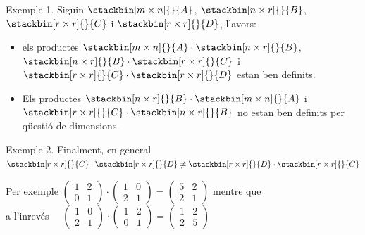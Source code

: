 \documentclass{beamer}
\begin{document}
\begin{frame}
\begin{exampleblock}{Exemple 1.}
Siguin $\stackbin[m\times n]{}{A}$, $\stackbin[n\times r]{}{B}$, $\stackbin[r\times r]{}{C}$ i $\stackbin[r\times r]{}{D}$, llavors:
 \begin{itemize}
 \item
 els productes $\stackbin[m\times n]{}{A}\cdot\stackbin[n\times r]{}{B}$, $\stackbin[n\times r]{}{B}\cdot\stackbin[r\times r]{}{C}$ i $\stackbin[r\times r]{}{C}\cdot\stackbin[r\times r]{}{D}$ estan ben definits.
\item
Els productes $\stackbin[n\times r]{}{B}\cdot\stackbin[m\times n]{}{A}$ i $\stackbin[r\times r]{}{C}\cdot\stackbin[n\times r]{}{B}$ no estan ben definits per qüestió de dimensions.
\end{itemize}
\end{exampleblock}
\begin{exampleblock}{Exemple 2.}
 Finalment, en general $\stackbin[r\times r]{}{C}\cdot\stackbin[r\times r]{}{D}\neq\stackbin[r\times r]{}{D}\cdot\stackbin[r\times r]{}{C}$

Per exemple
$\left(\begin{array}{cc}
1 & 2\\
0 & 1\end{array}\right)\cdot\left(\begin{array}{cc}
1 & 0\\
2 & 1\end{array}\right)=\left(\begin{array}{cc}
5 & 2\\
2 & 1\end{array}\right)$
\bigskip
mentre que\\
a l'inrevés $\quad\left(\begin{array}{cc}
1 & 0\\
2 & 1\end{array}\right)\cdot\left(\begin{array}{cc}
1 & 2\\
0 & 1\end{array}\right)=\left(\begin{array}{cc}
1 & 2\\
2 & 5\end{array}\right)$
\end{exampleblock}
\end{frame}
\end{document}
